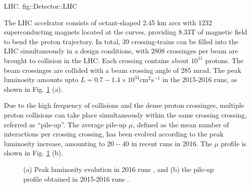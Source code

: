 {LHC. \cite{LHCPhoto}}
{fig::Detector::LHC}


The LHC accelrator consists of octant-shaped 2.45 km arcs with 1232 superconducting magnets located at the curves, providing 8.33T of magnetic field to bend the proton trajectory.
In total, 39 crossing-trains can be filled into the LHC simultaneously in a design conditions, with 2808 crossinges per beam are brought to collision in the LHC. Each crossing contains about $10^{11}$ protons. 
The beam crossinges are collided with a beam crossing angle of 285 mrad. 
The peak luminosity amounts upto $L = 0.7-1.4 \times 10^{34} \mathrm{cm}^{2} \mathrm{s}^{-1}$ in the 2015-2016 runs, as shown in Fig. \ref{fig::Detector::DAQ} (a).

Due to the high frequency of collisions and the dense proton crossinges, multiple proton collisions can take place simultaneously within the same crossing crossing, referred as ``pile-up''. 
The average pile-up $\mu$, defined as the mean number of interactions per crossing crossing,  
has been evolved according to the peak luminosity increase, amounting to $20-40$ in recent runs in 2016. The $\mu$ profile is shown in Fig. \ref{fig::Detector::DAQ} (b).

\begin{figure}[h]
  \centering
    \caption{  (a) Peak luminosity evolution in 2016 runs \cite{DAQ2016}, and (b) the pile-up profile obtained in 2015-2016 runs  \cite{lumiPubResult}.
      \label{fig::Detector::DAQ}
    }
\end{figure}



